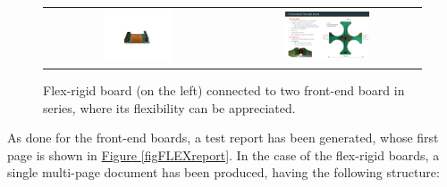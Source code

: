 \begin{figure}[h!]
    \centering
    \begin{tabular}{cc}
        \includegraphics[width=0.38\textwidth]{Images/chap2/flex_rigid_pic.pdf} & \includegraphics[width=0.475\textwidth]{Images/chap2/flex_rigid_two_FEBs.pdf}\\
    \end{tabular}
    \caption{Flex-rigid board (on the left) connected to two front-end board in series, where its flexibility can be appreciated.}
    \label{figDflexrigidPIC}
\end{figure}

\par
As done for the front-end boards, a test report has been generated, whose first page is shown in \hyperref[figFLEXreport]{Figure \ref{figFLEXreport}}. In the case of the flex-rigid boards, a single multi-page document has been produced, having the following structure:

\begin{table}[h!]
    \centering
    \def\arraystretch{2}
    \caption{Structure of the entry for the flex-rigid boards test report.}
    \label{tabFLEXstruct}
\end{table}


